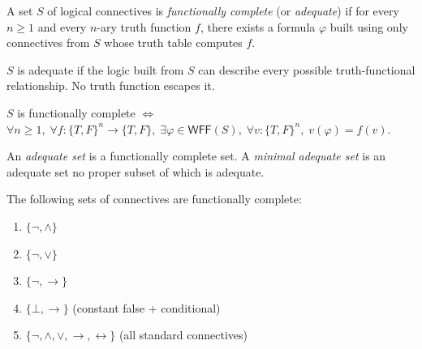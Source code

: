 \begin{tcolorbox}[colback=propbox, colframe=propborder, arc=2pt,
  left=6pt, right=6pt, top=4pt, bottom=4pt,
  title={\small\textbf{Definition (Functional Completeness)}},
  fonttitle=\small\bfseries]
\label{def:func-complete}
A set $S$ of logical connectives is \emph{functionally complete} (or
\emph{adequate}) if for every $n \geq 1$ and every $n$-ary truth function $f$,
there exists a formula $\varphi$ built using only connectives from $S$ whose
truth table computes $f$.
\end{tcolorbox}

\begin{remark}[Intuition]
$S$ is adequate if the logic built from $S$ can describe every possible
truth-functional relationship. No truth function escapes it.
\end{remark}

\begin{remark}
$S$ is functionally complete $\Longleftrightarrow$
$\forall n \geq 1,\; \forall f : \{T,F\}^n \to \{T,F\},\;
\exists \varphi \in \mathsf{WFF}(S),\;
\forall v : \{T,F\}^n,\; v(\varphi) = f(v)$.
\end{remark}

\begin{tcolorbox}[colback=propbox, colframe=propborder, arc=2pt,
  left=6pt, right=6pt, top=4pt, bottom=4pt,
  title={\small\textbf{Definition (Adequate Set / Minimal Adequate Set)}},
  fonttitle=\small\bfseries]
\label{def:adequate}\label{def:minimal}
An \emph{adequate set} is a functionally complete set.
A \emph{minimal adequate set} is an adequate set no proper subset of which is adequate.
\end{tcolorbox}

\begin{tcolorbox}[colback=thmbox, colframe=thmborder, arc=2pt,
  left=6pt, right=6pt, top=4pt, bottom=4pt,
  title={\small\textbf{Theorem (Standard Functionally Complete Sets)}},
  fonttitle=\small\bfseries]
\label{thm:std-adequate}
The following sets of connectives are functionally complete:
\begin{enumerate}
  \item $\{\neg, \wedge\}$
  \item $\{\neg, \vee\}$
  \item $\{\neg, \rightarrow\}$
  \item $\{\bot, \rightarrow\}$ \quad (constant false + conditional)
  \item $\{\neg, \wedge, \vee, \rightarrow, \leftrightarrow\}$ \quad (all standard connectives)
\end{enumerate}
\end{tcolorbox}


